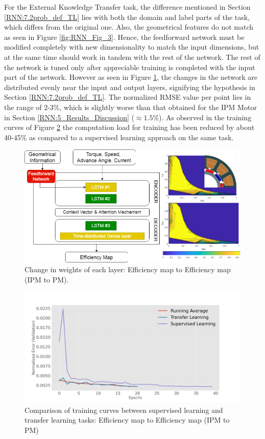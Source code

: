 For the External Knowledge Transfer task, the difference mentioned in Section \ref{RNN:7.2prob_def_TL} lies with both the domain and label parts of the task, which differs from the original one. Also, the geometrical features do not match as seen in Figure \ref{fig:RNN_Fig_3}. Hence, the feedforward network must be modified completely with new dimensionality to match the input dimensions, but at the same time should work in tandem with the rest of the network. The rest of the network is tuned only after appreciable training is completed with the input part of the network. However as seen in Figure \ref{fig:RNN_Fig4b}, the changes in the network are distributed evenly near the input and output layers, signifying the hypothesis in Section \ref{RNN:7.2prob_def_TL}. The normalized RMSE value per point lies in the range of 2-3\%, which is slightly worse than that obtained for the IPM Motor in Section \ref{RNN:5_Results_Discussion} ($\approx 1.5\%$). As observed in the training curves of  Figure  \ref{fig:RNN_Fig5b} the computation load for training has been reduced by about 40-45\% as compared to a supervised learning approach on the same task. 

\begin{figure}[h!]
    \centering
    \includegraphics[width=\textwidth]{Figures/Chp_RNN/Fig_4b.png}
    \caption{Change in weights of each layer: Efficiency map to Efficiency map (IPM to PM).}
    \label{fig:RNN_Fig4b}
\end{figure}

\begin{figure}[h!]
    \centering
    \includegraphics[width=\textwidth]{Figures/Chp_RNN/Fig_5b.png}
    \caption{Comparison of training curves between supervised learning and transfer learning tasks: Efficiency map to Efficiency map (IPM to PM)}
    \label{fig:RNN_Fig5b}
\end{figure}


